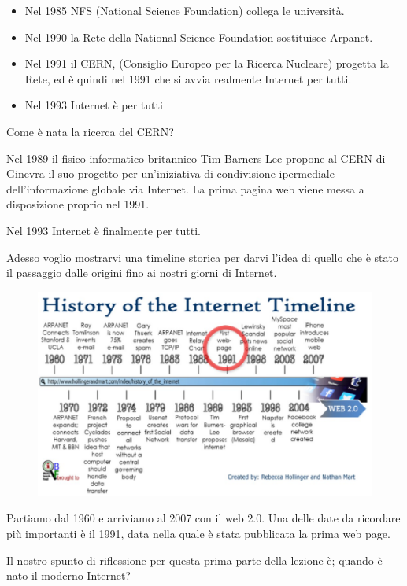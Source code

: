 \begin{itemize}
    \item Nel 1985 NFS (National Science Foundation) collega le università.
    \item Nel 1990 la Rete della National Science Foundation sostituisce Arpanet.
    \item Nel 1991 il CERN, (Consiglio Europeo per la Ricerca Nucleare) progetta la Rete, ed è quindi nel 1991 che si avvia realmente Internet per tutti.
    \item Nel 1993 Internet è per tutti
\end{itemize}

Come è nata la  ricerca del CERN? \par
Nel 1989 il fisico informatico britannico Tim Barners-Lee propone al CERN di Ginevra il suo progetto per un'iniziativa di condivisione ipermediale dell'informazione globale via Internet. La prima pagina web viene messa a disposizione proprio nel 1991. \par
Nel 1993 Internet è finalmente per tutti. \par
Adesso voglio mostrarvi una timeline storica per darvi l'idea di quello che è stato il passaggio dalle origini fino ai nostri giorni di Internet. \par
\begin{figure}[ht]
    \centering
    \includegraphics[width=0.9\linewidth]{images/03_lez_fig_01.jpg}
\end{figure}

Partiamo dal 1960 e arriviamo al 2007 con il web 2.0. Una delle date da ricordare più importanti è il 1991, data nella quale è stata pubblicata la prima web page.\par

Il nostro spunto di riflessione per questa prima parte della lezione è; quando è nato il moderno Internet? \par

